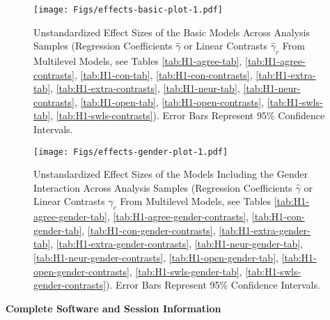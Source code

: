 \documentclass[
  english,
  man, noextraspace]{apa7}
\begin{document}
\begin{appendix}
\begin{figure}
\centering
\texttt{[image: Figs/effects-basic-plot-1.pdf]}
\caption{\label{fig:effects-basic-plot}Unstandardized Effect Sizes of the Basic
Models Across Analysis Samples (Regression Coefficients \(\hat{\gamma}\)
or Linear Contrasts \(\hat{\gamma}_{c}\) From Multilevel Models, see
Tables \ref{tab:H1-agree-tab}, \ref{tab:H1-agree-contrasts},
\ref{tab:H1-con-tab}, \ref{tab:H1-con-contrasts},
\ref{tab:H1-extra-tab}, \ref{tab:H1-extra-contrasts},
\ref{tab:H1-neur-tab}, \ref{tab:H1-neur-contrasts},
\ref{tab:H1-open-tab}, \ref{tab:H1-open-contrasts},
\ref{tab:H1-swls-tab}, \ref{tab:H1-swls-contrasts}). Error Bars
Represent 95\% Confidence Intervals.}
\end{figure}













\begin{figure}
\centering
\texttt{[image: Figs/effects-gender-plot-1.pdf]}
\caption{\label{fig:effects-gender-plot}Unstandardized Effect Sizes of the Models
Including the Gender Interaction Across Analysis Samples (Regression
Coefficients \(\hat{\gamma}\) or Linear Contrasts \(\hat{\gamma}_{c}\)
From Multilevel Models, see Tables \ref{tab:H1-agree-gender-tab},
\ref{tab:H1-agree-gender-contrasts}, \ref{tab:H1-con-gender-tab},
\ref{tab:H1-con-gender-contrasts}, \ref{tab:H1-extra-gender-tab},
\ref{tab:H1-extra-gender-contrasts}, \ref{tab:H1-neur-gender-tab},
\ref{tab:H1-neur-gender-contrasts}, \ref{tab:H1-open-gender-tab},
\ref{tab:H1-open-gender-contrasts}, \ref{tab:H1-swls-gender-tab},
\ref{tab:H1-swls-gender-contrasts}). Error Bars Represent 95\%
Confidence Intervals.}
\end{figure}

\newpage

\noindent  \textbf{Complete Software and Session Information}


\end{appendix}
\end{document}
